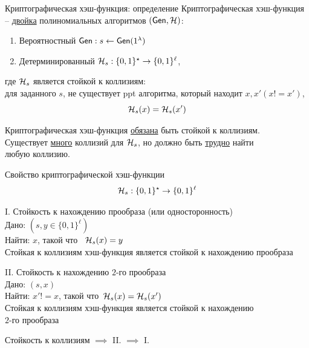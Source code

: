 \documentclass[usenames,dvipsnames,8pt,aspectratio=169]{beamer}
\begin{document}
\begin{frame}{Криптографическая хэш-функция: определение}
\Large
{\color{Orange}Криптографическая хэш-функция} -- \underline{двойка} полиномиальных алгоритмов $(\textsf{Gen}, \mathcal{H})$:
\begin{enumerate}
\itemsep 7pt
\item Вероятностный $\textsf{Gen}: s \leftarrow \textsf{Gen}(1^\lambda)$  
\item Детерминированный $\mathcal{H}_s: \{0,1\}^\star \rightarrow \{0,1\}^\ell$,
\end{enumerate}

где $\mathcal{H}_s$ является  {\color{Orange} стойкой к коллизиям}: \\[5pt]

для заданного $s$,  не существует ppt алгоритма, который находит $x, x' (x!=x')$,
\[
\mathcal{H}_s(x) = \mathcal{H}_s(x')
\]

{\color{Orange} Криптографическая} хэш-функция \underline{обязана} быть стойкой к коллизиям.\\[5pt]

Существует  \underline{много} коллизий для $\mathcal{H}_s$, но должно быть \underline{трудно} найти \\ любую коллизию.
\end{frame}

\begin{frame}{Свойство криптографической хэш-функции}
\Large 
\[
\mathcal{H}_s: \{0,1\}^\star \rightarrow \{0,1\}^\ell
\]

{\color{Orange} I.} Стойкость к нахождению прообраза (или односторонность) \\[5pt]
Дано: $(s, y \in \{0,1\}^\ell)$\\
Найти: $x$, такой что \ $\mathcal{H}_s(x) =  y$ \\[5pt]
{\color{Orange} Стойкая к коллизиям хэш-функция является стойкой к нахождению прообраза}


\vspace{20pt}
{\color{Orange} II.} Стойкость к нахождению $2$-го прообраза \\[5pt]
Дано: $(s, x)$\\
Найти: $x'!=x$, такой что\ $\mathcal{H}_s(x) =  \mathcal{H}_s(x')$ \\[5pt]
{\color{Orange}  Стойкая к коллизиям хэш-функция является стойкой к нахождению \\ $2$-го прообраза}

\vspace{20pt}

Стойкость к коллизиям  $\implies$ 	{\color{Orange} II.}  $\implies$ 	{\color{Orange} I.}  
\end{frame}
\end{document}
